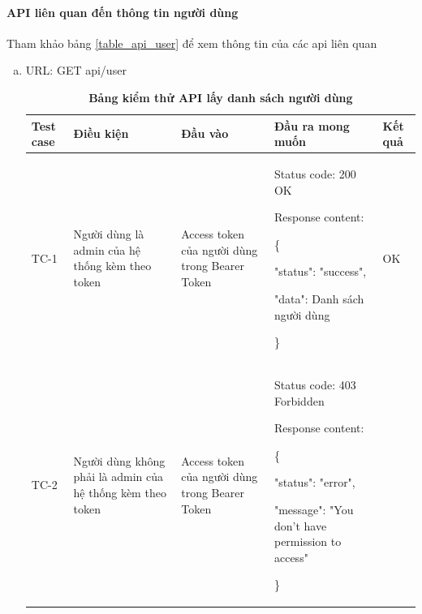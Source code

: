 \paragraph{API liên quan đến thông tin người dùng}
\mbox{}

Tham khảo bảng \ref{table_api_user} để xem thông tin của các api liên quan

\begin{enumerate}[a)]
  \item URL: GET api/user
  

  \begin{xltabular}{\textwidth}{
    | >{\raggedright\arraybackslash}p{1cm}
    | >{\raggedright\arraybackslash}p{2.5cm}
    | >{\raggedright\arraybackslash}p{3.5cm}
    | >{\raggedright\arraybackslash}X
    | >{\raggedright\arraybackslash}p{1cm}|
    }
    \caption{\bfseries \fontsize{12pt}{0pt}\selectfont Bảng kiểm thử API lấy danh sách người dùng}
    \\
    \hline
    \bfseries Test case    &\bfseries Điều kiện   &\bfseries Đầu vào 
    &\bfseries Đầu ra mong muốn &\bfseries Kết quả\\ \hline
  
  
    TC-1
    & Người dùng là admin của hệ thống kèm theo token
    & Access token của người dùng trong Bearer Token
  
    & 
  
    Status code: 200 OK
  
      Response content:
  
      \{
  
    "status": "success",
  
    "data": Danh sách người dùng
  
    \}
    
    & OK
  
    \\ \hline
  
    TC-2
    & Người dùng không phải là admin của hệ thống kèm theo token
    & Access token của người dùng trong Bearer Token
  
    & 
  
    Status code: 403 Forbidden
  
      Response content:
  
      \{
  
    "status": "error",
  
    "message": "You don't have permission to access"
  
    \}
    

\end{xltabular}
\end{enumerate}

